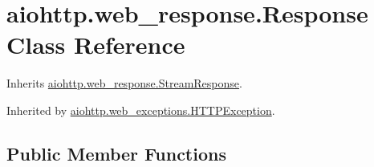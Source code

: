 \hypertarget{classaiohttp_1_1web__response_1_1_response}{}\section{aiohttp.\+web\+\_\+response.\+Response Class Reference}
\label{classaiohttp_1_1web__response_1_1_response}


Inherits \hyperlink{classaiohttp_1_1web__response_1_1_stream_response}{aiohttp.\+web\+\_\+response.\+Stream\+Response}.



Inherited by \hyperlink{classaiohttp_1_1web__exceptions_1_1_h_t_t_p_exception}{aiohttp.\+web\+\_\+exceptions.\+H\+T\+T\+P\+Exception}.

\subsection*{Public Member Functions}
